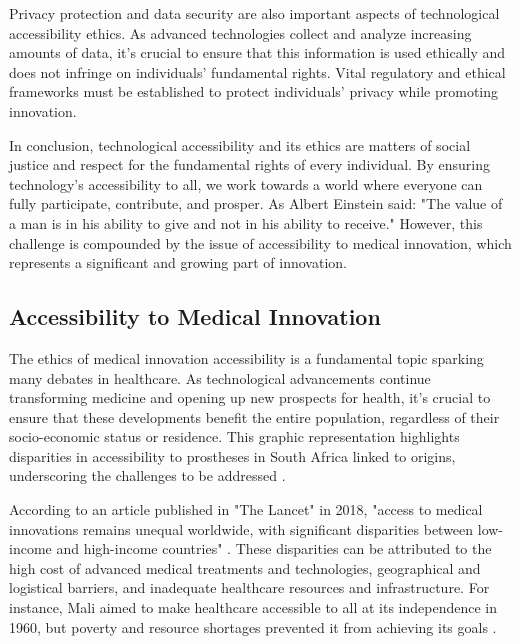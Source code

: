 Privacy protection and data security are also important aspects of technological accessibility ethics. As advanced technologies collect and analyze increasing amounts of data, it’s crucial to ensure that this information is used ethically and does not infringe on individuals' fundamental rights. Vital regulatory and ethical frameworks must be established to protect individuals' privacy while promoting innovation.

In conclusion, technological accessibility and its ethics are matters of social justice and respect for the fundamental rights of every individual. By ensuring technology's accessibility to all, we work towards a world where everyone can fully participate, contribute, and prosper. As Albert Einstein said: "The value of a man is in his ability to give and not in his ability to receive."
However, this challenge is compounded by the issue of accessibility to medical innovation, which represents a significant and growing part of innovation.

\subsection{Accessibility to Medical Innovation}
The ethics of medical innovation accessibility is a fundamental topic sparking many debates in healthcare. As technological advancements continue transforming medicine and opening up new prospects for health, it’s crucial to ensure that these developments benefit the entire population, regardless of their socio-economic status or residence. This graphic representation highlights disparities in accessibility to prostheses in South Africa linked to origins, underscoring the challenges to be addressed \cite{noauthor_exploring_nodate}.


According to an article published in "The Lancet" in 2018, "access to medical innovations remains unequal worldwide, with significant disparities between low-income and high-income countries" \cite{hanson_lancet_2022}. These disparities can be attributed to the high cost of advanced medical treatments and technologies, geographical and logistical barriers, and inadequate healthcare resources and infrastructure. For instance, Mali aimed to make healthcare accessible to all at its independence in 1960, but poverty and resource shortages prevented it from achieving its goals \cite{noauthor_fragility_nodate}.

